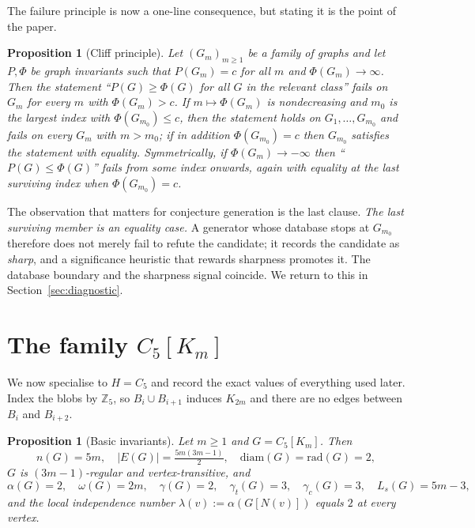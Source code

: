 \documentclass[10pt,a4paper]{article}
\theoremstyle{plain}
\newtheorem{proposition}[theorem]{Proposition}
\theoremstyle{definition}
\newcommand{\ZZ}{\mathbb{Z}}
\newcommand{\ind}{\alpha}
\newcommand{\gt}{\gamma_t}
\newcommand{\gc}{\gamma_c}
\newcommand{\Ls}{L_s}
\newcommand{\blow}[2]{#1[K_{#2}]}
\begin{document}
The failure principle is now a one-line consequence, but stating it is the point of the paper.

\begin{proposition}[Cliff principle]\label{prop:cliff}
Let $(G_m)_{m \ge 1}$ be a family of graphs and let $P, \Phi$ be graph invariants such that
$P(G_m) = c$ for all $m$ and $\Phi(G_m) \to \infty$. Then the statement
``$P(G) \ge \Phi(G)$ for all $G$ in the relevant class'' fails on $G_m$ for every $m$ with
$\Phi(G_m) > c$. If $m \mapsto \Phi(G_m)$ is nondecreasing and $m_0$ is the largest index with
$\Phi(G_{m_0}) \le c$, then the statement holds on $G_1, \dots, G_{m_0}$ and fails on every
$G_m$ with $m > m_0$; if in addition $\Phi(G_{m_0}) = c$ then $G_{m_0}$ satisfies the statement
with equality. Symmetrically, if $\Phi(G_m) \to -\infty$ then ``$P(G) \le \Phi(G)$'' fails from
some index onwards, again with equality at the last surviving index when
$\Phi(G_{m_0}) = c$.
\end{proposition}

The observation that matters for conjecture generation is the last clause.
\emph{The last surviving member is an equality case.} A generator whose database stops at
$G_{m_0}$ therefore does not merely fail to refute the candidate; it records the candidate as
\emph{sharp}, and a significance heuristic that rewards sharpness promotes it. The database
boundary and the sharpness signal coincide. We return to this in
Section~\ref{sec:diagnostic}.

\section{The family $\blow{C_5}{m}$}\label{sec:family}

We now specialise to $H = C_5$ and record the exact values of everything used later. Index the
blobs by $\ZZ_5$, so $B_i \cup B_{i+1}$ induces $K_{2m}$ and there are no edges between $B_i$
and $B_{i+2}$.

\begin{proposition}[Basic invariants]\label{prop:basic}
Let $m \ge 1$ and $G = \blow{C_5}{m}$. Then
\[
n(G) = 5m, \quad |E(G)| = \tfrac{5m(3m-1)}{2}, \quad
\mathrm{diam}(G) = \mathrm{rad}(G) = 2,
\]
$G$ is $(3m-1)$-regular and vertex-transitive, and
\[
\ind(G) = 2, \quad \omega(G) = 2m, \quad
\gamma(G) = 2, \quad \gt(G) = 3, \quad \gc(G) = 3, \quad \Ls(G) = 5m - 3 ,
\]
and the local independence number $\lambda(v) := \ind(G[N(v)])$ equals $2$ at every vertex.
\end{proposition}
\end{document}
